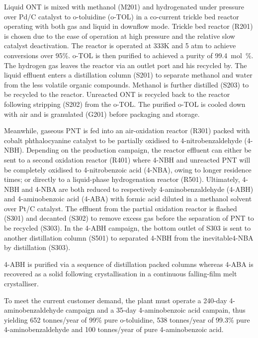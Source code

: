 Liquid ONT is mixed with methanol (M201) and hydrogenated under pressure over Pd/C catalyst to o-toluidine (o-TOL) in a co-current trickle bed reactor operating with both gas and liquid in downflow mode. Trickle bed reactor (R201) is chosen due to the ease of operation at high pressure and the relative slow catalyst deactivation. The reactor is operated at 333K and 5 atm to achieve conversions over 95\%. o-TOL is then purified to achieved a purity of \SI{99.4}{mol\percent}. The hydrogen gas leaves the reactor via an outlet port and his recycled by. The liquid effluent enters a distillation column (S201) to separate methanol and water from the less volatile organic compounds. Methanol is further distilled (S203) to be recycled to the reactor. Unreacted ONT is recycled back to the reactor following stripping (S202) from the o-TOL. The purified o-TOL is cooled down with air and is granulated (G201) before packaging and storage.

Meanwhile, gaseous PNT is fed into an air-oxidation reactor (R301) packed with cobalt phthalocyanine catalyst to be partially oxidised to 4-nitrobenzaldehyde (4-NBH). Depending on the production campaign, the reactor effluent can either be sent to a second oxidation reactor (R401) where 4-NBH and unreacted PNT will be completely oxidised to 4-nitrobenzoic acid (4-NBA), owing to longer residence times; or directly to a liquid-phase hydrogenation reactor (R501). Ultimately, 4-NBH and 4-NBA are both reduced to respectively 4-aminobenzaldehyde (4-ABH) and 4-aminobenzoic acid (4-ABA) with formic acid diluted in a methanol solvent over Pt/C catalyst. The effluent from the partial oxidation reactor is flashed (S301) and decanted (S302) to remove excess gas before the separation of PNT to be recycled (S303). 
In the 4-ABH campaign, the bottom outlet of S303 is sent to another distillation column (S501) to separated 4-NBH from the inevitable4-NBA by distillation (S303). 

4-ABH is purified via a sequence of distillation packed columns whereas 4-ABA is recovered as a solid following  crystallisation in a continuous falling-film melt crystalliser.

 To meet the current customer demand, the plant must operate a 240-day 4-aminobenzaldehyde campaign and a 35-day 4-aminobenzoic acid campain, thus yielding 652 tonnes/year of 99\% pure o-toluidine, 538 tonnes/year of 99.3\% pure 4-aminobenzaldehyde and 100 tonnes/year of pure 4-aminobenzoic acid.